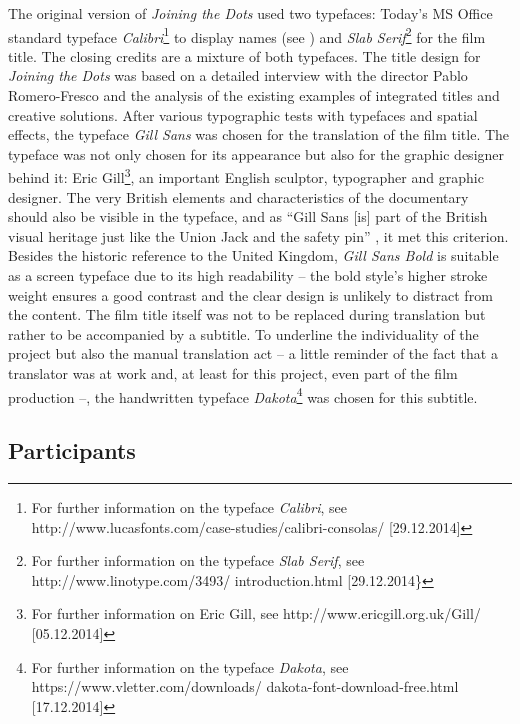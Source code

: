\documentclass[output=paper]{langsci/langscibook}
\begin{document}
The original version of \textit{Joining the Dots} used two typefaces: Today's MS Office standard typeface \textit{Calibri}\footnote{For further information on the typeface \textit{Calibri}, see http://www.lucasfonts.com/case-studies/calibri-consolas/ [29.12.2014]} to display names (see ) and \textit{Slab Serif}\footnote{For further information on the typeface \textit{Slab Serif}, see http://www.linotype.com/3493/ introduction.html [29.12.2014\}} for the film title. The closing credits are a mixture of both typefaces. The title design for \textit{Joining the Dots} was based on a detailed interview with the director Pablo Romero-Fresco and the analysis of the existing examples of integrated titles and creative solutions. After various typographic tests with typefaces and spatial effects, the typeface \textit{Gill Sans} was chosen for the translation of the film title. The typeface was not only chosen for its appearance but also for the graphic designer behind it: Eric Gill\footnote{For further information on Eric Gill, see http://www.ericgill.org.uk/Gill/ [05.12.2014]}, an important English sculptor, typographer and graphic designer. The very British elements and characteristics of the documentary should also be visible in the typeface, and as ``Gill Sans [is] part of the British visual heritage just like the Union Jack and the safety pin'' \citep{WQ01}, it met this criterion. Besides the historic reference to the United Kingdom, \textit{Gill Sans Bold} is suitable as a screen typeface due to its high readability -- the bold style's higher stroke weight ensures a good contrast and the clear design is unlikely to distract from the content. The film title itself was not to be replaced during translation but rather to be accompanied by a subtitle. To underline the individuality of the project but also the manual translation act -- a little reminder of the fact that a translator was at work and, at least for this project, even part of the film production --, the handwritten typeface \textit{Dakota}\footnote{For further information on the typeface \textit{Dakota}, see https://www.vletter.com/downloads/ dakota-font-download-free.html [17.12.2014]} was chosen for this subtitle.

\subsection{Participants}
\end{document}
